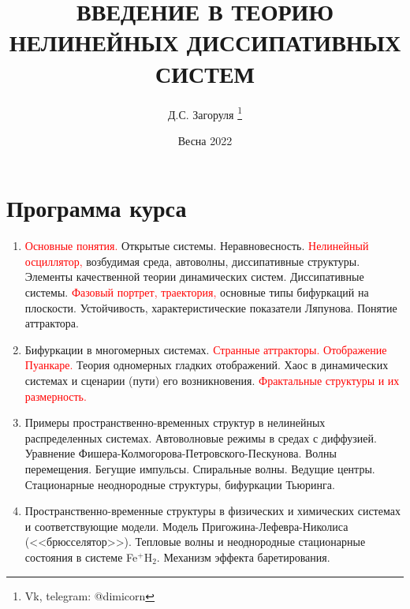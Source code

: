 \documentclass[12pt, twoside, a4paper]{article}
\title{\large \textbf{ВВЕДЕНИЕ В ТЕОРИЮ НЕЛИНЕЙНЫХ ДИССИПАТИВНЫХ СИСТЕМ}}
\author{Д.С. Загоруля \footnote{Vk, telegram: @dimicorn}}
\date{Весна 2022}
\theoremstyle{definition}
\begin{document}
\maketitle
\tableofcontents
\newpage
\section{Программа курса}
\begin{enumerate}
    \item \textcolor{red}{Основные понятия.} Открытые системы. Неравновесность. \textcolor{red}{Нелинейный осциллятор,} возбудимая среда, автоволны, диссипативные структуры. Элементы качественной теории динамических систем. Диссипативные системы. \textcolor{red}{Фазовый портрет, траектория,} основные типы бифуркаций на плоскости. Устойчивость, характеристические показатели Ляпунова. Понятие аттрактора.
    \item Бифуркации в многомерных системах. \textcolor{red}{Странные аттракторы. Отображение Пуанкаре.} Теория одномерных гладких отображений. Хаос в динамических системах и сценарии (пути) его возникновения. \textcolor{red}{Фрактальные структуры и их размерность.}
    \item Примеры пространственно-временных структур в нелинейных распределенных системах. Автоволновые режимы в средах с диффузией. Уравнение Фишера-Колмогорова-Петровского-Пескунова. Волны перемещения. Бегущие импульсы. Спиральные волны. Ведущие центры. Стационарные неоднородные структуры, бифуркации Тьюринга.
    \item Пространственно-временные структуры в физических и химических системах и соответствующие модели. Модель Пригожина-Лефевра-Николиса (<<брюсселятор>>). Тепловые волны и неоднородные стационарные состояния в системе Fe$^{+}$H$_{2}$. Механизм эффекта баретирования. 
\end{enumerate}
\newpage

\newpage
\end{document}

